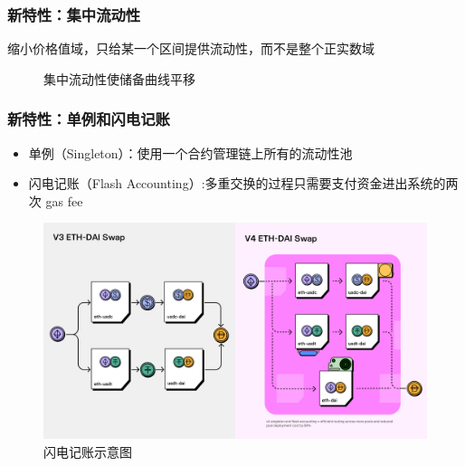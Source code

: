 \documentclass{beamer}
\begin{document}
\begin{frame}
    \frametitle{新特性：集中流动性}

    缩小价格值域，只给某一个区间提供流动性，而不是整个正实数域

    \begin{figure}
        \centering
        \caption{集中流动性使储备曲线平移}
    \end{figure}

\end{frame}

\begin{frame}
    \frametitle{新特性：单例和闪电记账}

    \begin{itemize}
        \item 单例（Singleton）：使用一个合约管理链上所有的流动性池
        \item 闪电记账（Flash Accounting）:多重交换的过程只需要支付资金进出系统的两次 gas fee
    \end{itemize}

    \begin{figure}[htbp]
        \centering
        \includegraphics[width=12cm]{../notes/闪电记账示意图.jpg}
        \caption{闪电记账示意图}
    \end{figure}
\end{frame}
\end{document}
